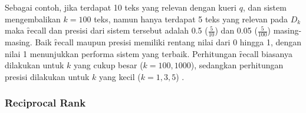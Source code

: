         Sebagai contoh, jika terdapat 10 teks yang relevan dengan kueri $q$, dan sistem mengembalikan $k=100$ teks, namun hanya terdapat 5 teks yang relevan pada $D_k$  maka \f{recall} dan presisi dari sistem tersebut adalah 0.5 ($\frac{5}{10}$) dan 0.05 ($\frac{5}{100}$) masing-masing. Baik \f{recall} maupun presisi memiliki rentang nilai dari 0 hingga 1, dengan nilai 1 menunjukkan performa sistem yang terbaik. Perhitungan \f{recall} biasanya dilakukan untuk $k$ yang cukup besar ($k = 100,1000 $), sedangkan perhitungan presisi dilakukan untuk $k$ yang kecil ($k = 1, 3, 5$) \citep{irlecture}.


        \subsubsection{\f{Reciprocal Rank}}

